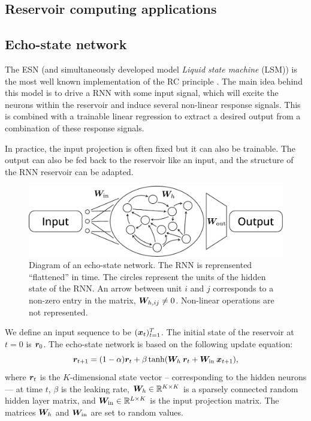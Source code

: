 \subsection{Reservoir computing applications}

\subsection{Echo-state network}

The \acf{ESN} (and simultaneously developed model \emph{Liquid state machine}
(LSM)) is the most well known implementation of the \ac{RC} principle
\parencite{tanakaRecentAdvancesPhysical2019}. The main idea behind this model is
to drive a \ac{RNN} with some input signal, which will excite the neurons within
the reservoir and induce several non-linear response signals. This is combined
with a trainable linear regression to extract a desired output from a
combination of these response signals.

In practice, the input projection is often fixed but it can also be trainable.
The output can also be fed back to the reservoir like an input, and the
structure of the \ac{RNN} reservoir can be adapted.

\begin{figure}[htbp]
  \centering
  \includegraphics[width=.8\linewidth]{figures/echo_state_network}
  \caption{Diagram of an echo-state network. The \ac{RNN} is reprensented
    ``flattened'' in time. The circles represent the units of the hidden state
    of the \ac{RNN}. An arrow between unit $i$ and $j$ corresponds to a non-zero
    entry in the matrix, ${\bm{W}}_{h, ij} \neq 0$. Non-linear operations are not
    represented.}
  \label{fig:echo_state_network}
\end{figure}

We define an input sequence to be $({\bm{x}}_{t})_{t=1}^{T}$. The initial state of
the reservoir at $t = 0$ is ${\bm{r}}_{0}$. The echo-state network is based on the
following update equation:
\begin{equation}
  \label{eq:esn}
  {\bm{r}}_{t + 1} = (1 - \alpha) {\bm{r}}_{t}
  +
  \beta \tanh({\bm{W}}_{h}\: {\bm{r}}_{t} + {\bm{W}}_{\text{in}}\: {\bm{x}}_{t + 1}),
\end{equation}
where ${\bm{r}}_{t}$ is the $K$-dimensional state vector -- corresponding to the
hidden neurons --- at time $t$, $\beta$ is the leaking rate,
${\bm{W}}_{h} \in \mathbb{R}^{K \times K}$ is a sparsely connected random hidden
layer matrix, and ${\bm{W}}_{\text{in}} \in \mathbb{R}^{L \times K}$ is the input
projection matrix. The matrices ${\bm{W}}_{h}$ and ${\bm{W}}_{\text{in}}$ are set to
random values.

